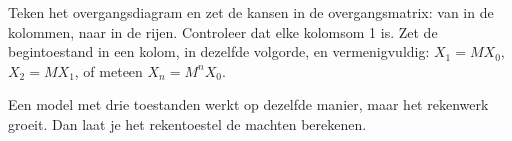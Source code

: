 \begin{werkwijze}
Teken het overgangsdiagram en zet de kansen in de overgangsmatrix: van in de kolommen, naar in de rijen. Controleer dat elke kolomsom 1 is. Zet de begintoestand in een kolom, in dezelfde volgorde, en vermenigvuldig: $X_1 = M X_0$, $X_2 = M X_1$, of meteen $X_n = M^n X_0$.
\end{werkwijze}


\begin{oefeningen}
\end{oefeningen}

Een model met drie toestanden werkt op dezelfde manier, maar het rekenwerk groeit. Dan laat je het rekentoestel de machten berekenen.

